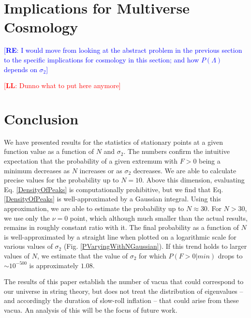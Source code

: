 \documentclass[12pt]{article}
\newcommand{\re}[1]{\textcolor{blue}{[{\bf RE}: #1]}}
\newcommand{\lfl}[1]{\textcolor{red}{[{\bf LL}: #1]}}
\begin{document}

\section{Implications for Multiverse Cosmology}

\re{I would move from looking at the abstract problem in the previous section to the specific implications for cosmology in this section; and how $P(\Lambda)$ depends on $\sigma_2$}

\lfl{Dunno what to put here anymore}

\section{Conclusion}
We have presented results for the statistics of stationary points at a given function value as a function of $N$ and $\sigma_2$. The numbers confirm the intuitive expectation that the probability of a given extremum with $F > 0$ being a minimum decreases as $N$ increases or as $\sigma_2$ decreases. We are able to calculate precise values for the probability up to $N=10$. Above this dimension, evaluating Eq. \ref{DensityOfPeaks} is computationally prohibitive, but we find that Eq. \ref{DensityOfPeaks} is well-approximated by a Gaussian integral. Using this approximation, we are able to estimate the probability up to $N \approx 30$. For $N>30$, we use only the $\nu=0$ point, which although much smaller than the actual results, remains in roughly constant ratio with it. The final probability as a function of $N$ is well-approximated by a straight line when plotted on a logarithmic scale for various values of $\sigma_2$ (Fig. \ref{PVaryingWithNGaussian}). If this trend holds to larger values of $N$, we estimate that the value of $\sigma_2$ for which $P(F>0|min)$ drops to $\sim 10^{-500}$ is approximately $1.08$.

The results of this paper establish the number of vacua that could correspond to our universe in string theory, but does not treat the distribution of eigenvalues -- and accordingly the duration of slow-roll inflation -- that could arise from these vacua. An analysis of this will be the focus of future work.
\end{document}
